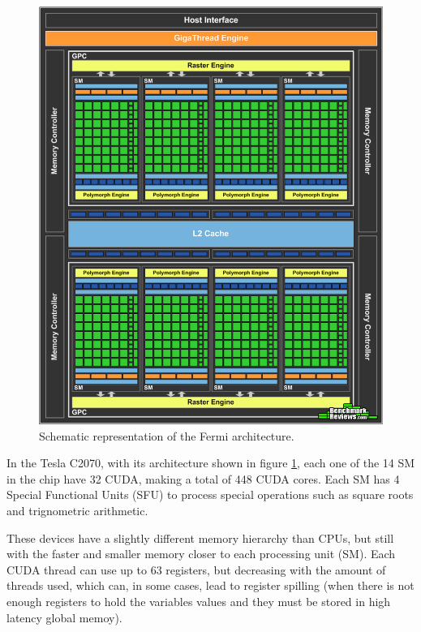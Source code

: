 \begin{figure}[!htp]
	\begin{center}
		\includegraphics[scale=0.3]{../../common/img/fermi_arch.png}
		\caption{Schematic representation of the \nvidia Fermi architecture.}
		\label{fig:FermiArchitecture}
	\end{center}
\end{figure}

In the Tesla C2070, with its architecture shown in figure \ref{fig:FermiArchitecture}, each one of the 14 SM in the chip have 32 CUDA, making a total of 448 CUDA cores. Each SM has 4 Special Functional Units (SFU) to process special operations such as square roots and trignometric arithmetic.

These devices have a slightly different memory hierarchy than CPUs, but still with the faster and smaller memory closer to each processing unit (SM). Each CUDA thread can use up to 63 registers, but decreasing with the amount of threads used, which can, in some cases, lead to register spilling (when there is not enough registers to hold the variables values and they must be stored in high latency global memoy).

